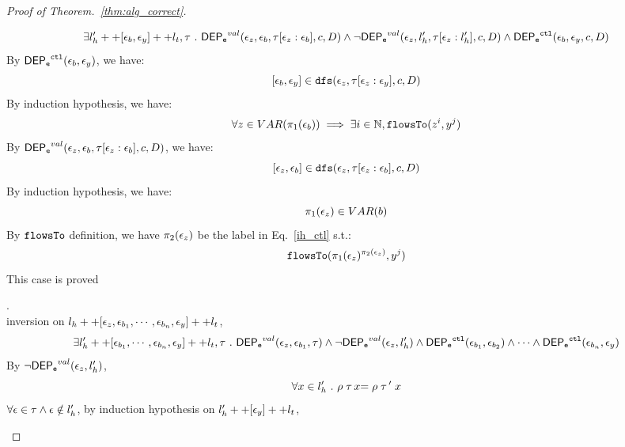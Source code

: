 \begin{proof}[Proof of Theorem.~\ref{thm:alg_correct}]
\begin{case}
\begin{subcase}
\[
  \exists l_{h}' ++ [\mathtt{\epsilon}_b, \mathtt{\epsilon}_y] ++ l_t, \mathtt{\tau} ~.~
  \mathsf{DEP_{\mathtt{e}}}^{val}(\mathtt{\epsilon}_z, \mathtt{\epsilon}_b, \mathtt{\tau}[\mathtt{\epsilon}_z: \mathtt{\epsilon}_b], c, D)
  \land 
  \neg \mathsf{DEP_{\mathtt{e}}}^{val} (\mathtt{\epsilon}_z, l_h', \mathtt{\tau}[\mathtt{\epsilon}_z: l_h'], c, D)
  \land 
  \mathsf{DEP_{\mathtt{e}}}^{\mathtt{{ctl}}} (\mathtt{\epsilon}_b, \mathtt{\epsilon}_y, c, D)
\]
%
By $\mathsf{DEP_{\mathtt{e}}}^{\mathtt{{ctl}}} (\mathtt{\epsilon}_b, \mathtt{\epsilon}_y) $, we have:
\[
  [\mathtt{\epsilon}_b, \mathtt{\epsilon}_y]\in \mathtt{dfs}(\mathtt{\epsilon}_{z}, \mathtt{\tau}[\mathtt{\epsilon}_{z}:\mathtt{\epsilon}_{y}], c, D)
\]
%
By induction hypothesis, we have:
\begin{equation}
\label{ih_ctl}
  \forall z \in VAR(\pi_1(\mathtt{\epsilon}_b)) \implies \exists i \in \mathbb{N}, \mathtt{flowsTo}(z^i, y^j)
\end{equation}
%
By $\mathsf{DEP_{\mathtt{e}}}^{val}(\mathtt{\epsilon}_z, \mathtt{\epsilon}_b, \mathtt{\tau}[\mathtt{\epsilon}_z: \mathtt{\epsilon}_b], c, D)$, we have:
\[
  [\mathtt{\epsilon}_z, \mathtt{\epsilon}_b]\in \mathtt{dfs}(\mathtt{\epsilon}_{z}, \mathtt{\tau}[\mathtt{\epsilon}_{z}:\mathtt{\epsilon}_{b}], c, D)
\]
%
By induction hypothesis, we have:
\[
  \pi_1(\mathtt{\epsilon}_z) \in VAR(b)
\]
%
By $\mathtt{flowsTo}$ definition, we have $\pi_2(\mathtt{\epsilon}_z)$ be the label in Eq.~\ref{ih_ctl} s.t.:
\[
  \mathtt{flowsTo}(\pi_1(\mathtt{\epsilon}_z)^{\pi_2(\mathtt{\epsilon}_z)}, y^j)
\]
%
This case is proved
%
%
\end{subcase}
%
\begin{subcase}.
\\
inversion on  $l_h ++ {[\mathtt{\epsilon}_z,  \mathtt{\epsilon}_{b_1}, \cdots, \mathtt{\epsilon}_{b_n},\mathtt{\epsilon}_y]} ++ l_t$, 
\[
  \exists l_{h}' ++ [ \mathtt{\epsilon}_{b_1}, \cdots, \mathtt{\epsilon}_{b_n}, \mathtt{\epsilon}_y] ++ l_t, \mathtt{\tau} ~.~
  \mathsf{DEP_{\mathtt{e}}}^{val}(\mathtt{\epsilon}_z, \mathtt{\epsilon}_{b_1}, \mathtt{\tau})
  \land 
  \neg \mathsf{DEP_{\mathtt{e}}}^{val} (\mathtt{\epsilon}_z, l_h')
  \land 
  \mathsf{DEP_{\mathtt{e}}}^{\mathtt{{ctl}}} (\mathtt{\epsilon}_{b_1}, \mathtt{\epsilon}_{b_2})
  \land 
  \cdots
  \land 
  \mathsf{DEP_{\mathtt{e}}}^{\mathtt{{ctl}}} (\mathtt{\epsilon}_{b_n}, \mathtt{\epsilon}_y)
\]
%
By $\neg \mathsf{DEP_{\mathtt{e}}}^{val} (\mathtt{\epsilon}_z, l_h')$, 
\[
  \forall x \in l_h' ~.~
  \rho \mathrel{ {\mathtt{\tau}} \, {x} } = \rho \mathrel{ {\mathtt{\tau}} \, {'} } x
\]
%
$\forall \mathtt{\epsilon} \in \mathtt{\tau} \land \mathtt{\epsilon} \notin l_h'$, by induction hypothesis on $l_{h}' ++ [\mathtt{\epsilon}_y] ++ l_t$, 

\end{subcase}
\end{case}
\end{proof}
